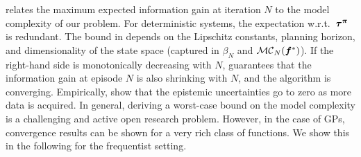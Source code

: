  relates the maximum expected information gain at iteration $N$ to the model complexity of our problem. For deterministic systems, the expectation w.r.t.~${\bm{\tau}}^{{\bm{\pi}}}$ is redundant.
The bound in  depends on the Lipschitz constants, planning horizon, and dimensionality of the state space (captured in $\beta_{N}$ and ${{\mathcal{M}}{\mathcal{C}}}_N({\bm{f}}^*)$). %
If the right-hand side is monotonically decreasing with $N$,  guarantees that the information gain at episode $N$ is also shrinking with $N$, and the algorithm is converging. 
Empirically, \cite{pathak2019self} show that the epistemic uncertainties go to zero as more data is acquired.
In general, deriving a worst-case bound on the model complexity is a challenging and active open research problem. However, in the case of GPs, convergence results can be shown for a very rich class of functions. We show this in the following for the frequentist setting.

